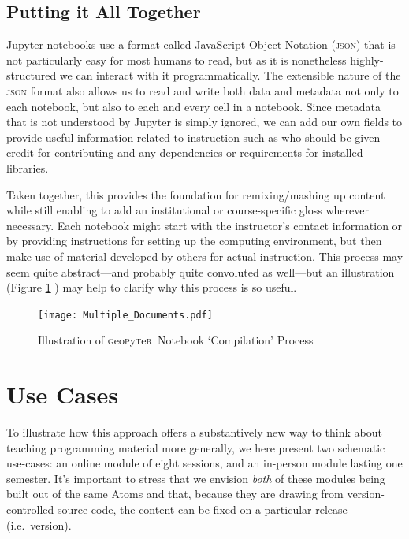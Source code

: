 \documentclass[letter, 11pt,titlepage]{article}
\newcommand{\gp}{\textsc{g}eo\textsc{p}y\textsc{t}e\textsc{r}~\/}
\newcommand{\ie}{i.e.~\/}
\begin{document}
\subsection{Putting it All Together}

Jupyter notebooks use a format called JavaScript Object Notation (\textsc{json}) that is not particularly easy for most humans to read, but as it is nonetheless highly-structured we can interact with it programmatically. The extensible nature of the \textsc{json} format also allows us to read and write both data and metadata not only to each notebook, but also to each and every cell in a notebook. Since metadata that is not understood by Jupyter is simply ignored, we can add our own fields to provide useful information related to instruction such as who should be given credit for contributing and any dependencies or requirements for installed libraries.

Taken together, this provides the foundation for remixing/mashing up content while still enabling to add an institutional or course-specific gloss wherever necessary. Each notebook might start with the instructor's contact information or by providing instructions for setting up the computing environment, but then make use of material developed by others for actual instruction. This process may seem quite abstract---and probably quite convoluted as well---but an illustration (Figure \ref{fig:compiling} ) may help to clarify why this process is so useful.

\begin{figure}[hbtp]
  \centering
  \caption{Illustration of \gp Notebook `Compilation' Process}
  \label{fig:compiling}
  \texttt{[image: Multiple\_Documents.pdf]}
\end{figure}

\section{Use Cases}\label{uses}

To illustrate how this approach offers a substantively new way to think about teaching programming material more generally, we here present two schematic use-cases: an online module of eight sessions, and an in-person module lasting one semester. It's important to stress that we envision \emph{both} of these modules being built out of the same Atoms and that, because they are drawing from version-controlled source code, the content can be fixed on a particular release (\ie version).
\end{document}
